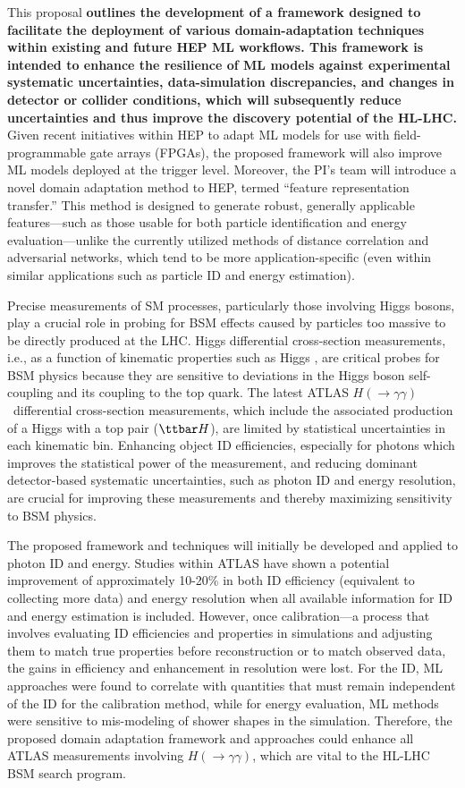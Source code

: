 \documentclass[letter, USenglish, 11pt, subfigure]{article}
\newcommand{\tth}{\ensuremath{\ttbar H}}
\newcommand{\hyy}{\ensuremath{H(\to\gamma\gamma)}}
\begin{document}
This proposal {\bf outlines the development of a framework designed to facilitate the deployment of various domain-adaptation techniques within existing and future HEP ML workflows. This framework is intended to enhance the resilience of ML models against experimental systematic uncertainties, data-simulation discrepancies, and changes in detector or collider conditions, which will subsequently reduce uncertainties and thus improve the discovery potential of the HL-LHC.} Given recent initiatives within HEP to adapt ML models for use with field-programmable gate arrays (FPGAs), the proposed framework will also improve ML models deployed at the trigger level. Moreover, the PI's team will introduce a novel domain adaptation method to HEP, termed ``feature representation transfer.'' This method is designed to generate robust, generally applicable features—such as those usable for both particle identification and energy evaluation—unlike the currently utilized methods of distance correlation and adversarial networks, which tend to be more application-specific (even within similar applications such as particle ID and energy estimation).

Precise measurements of SM processes, particularly those involving Higgs bosons, play a crucial role in probing for BSM effects caused by particles too massive to be directly produced at the LHC. Higgs differential cross-section measurements, i.e., as a function of kinematic properties such as Higgs \pt, are critical probes for BSM physics because they are sensitive to deviations in the Higgs boson self-coupling and its coupling to the top quark. The latest ATLAS \hyy\ differential cross-section measurements, which include the associated production of a Higgs with a top pair (\tth), are limited by statistical uncertainties in each kinematic bin. Enhancing object ID efficiencies, especially for photons which improves the statistical power of the measurement, and reducing dominant detector-based systematic uncertainties, such as photon ID and energy resolution, are crucial for improving these measurements and thereby maximizing sensitivity to BSM physics.

The proposed framework and techniques will initially be developed and applied to photon ID and energy. Studies within ATLAS have shown a potential improvement of approximately 10-20\% in both ID efficiency (equivalent to collecting more data) and energy resolution when all available information for ID and energy estimation is included. However, once calibration—a process that involves evaluating ID efficiencies and properties in simulations and adjusting them to match true properties before reconstruction or to match observed data, the gains in efficiency and enhancement in resolution were lost. For the ID, ML approaches were found to correlate with quantities that must remain independent of the ID for the calibration method, while for energy evaluation, ML methods were sensitive to mis-modeling of shower shapes in the simulation. Therefore, the proposed domain adaptation framework and approaches could enhance all ATLAS measurements involving \hyy, which are vital to the HL-LHC BSM search program.
\end{document}

